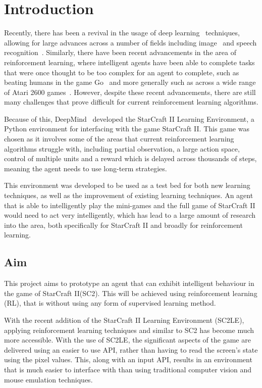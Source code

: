 \chapter{Introduction}%
\label{intro}

Recently, there has been a revival in the usage of deep
learning~\cite{lecun2015deep} techniques, allowing for large advances across a
number of fields including image~\cite{krizhevsky2012imagenet} and speech
recognition~\cite{graves2013speech, hinton2012deep}. Similarly, there have been
recent advancements in the area of reinforcement learning, where intelligent
agents have been able to complete tasks that were once thought to be too complex
for an agent to complete, such as beating humans in the game
Go~\cite{silver2016mastering} and more generally such as across a wide range of
Atari 2600 games~\cite{mnih2015human}. However, despite these recent
advancements, there are still many challenges that prove difficult for current
reinforcement learning algorithms.

Because of this, DeepMind~\cite{deepmind} developed the
StarCraft II Learning Environment\cite{vinyals2017starcraft}, a Python
environment for interfacing with the game StarCraft II\cite{pysc2, starcraft2}.
This game was chosen as it involves some of the areas that current reinforcement
learning algorithms struggle with, including partial observation, a large action
space, control of multiple units and a reward which is delayed across thousands of
steps, meaning the agent needs to use long-term strategies.

This environment was developed to be used as a test bed for both new learning
techniques, as well as the improvement of existing learning techniques. An agent
that is able to intelligently play the mini-games and the full game of
StarCraft II would need to act very intelligently, which has lead to a large
amount of research into the area, both specifically for StarCraft II and
broadly for reinforcement learning.

\section{Aim}

This project aims to prototype an agent that can exhibit intelligent behaviour
in the game of StarCraft II\@ (SC2). This will be achieved using reinforcement
learning (RL), that is without using any form of supervised learning method.

With the recent addition of the StarCraft II Learning Environment (SC2LE),
applying reinforcement learning techniques and similar to SC2 has become much
more accessible. With the use of SC2LE, the significant aspects of the game are
delivered using an easier to use API, rather than having to read the screen's
state using the pixel values. This, along with an input API, results in an
environment that is much easier to interface with than using traditional
computer vision and mouse emulation techniques.

